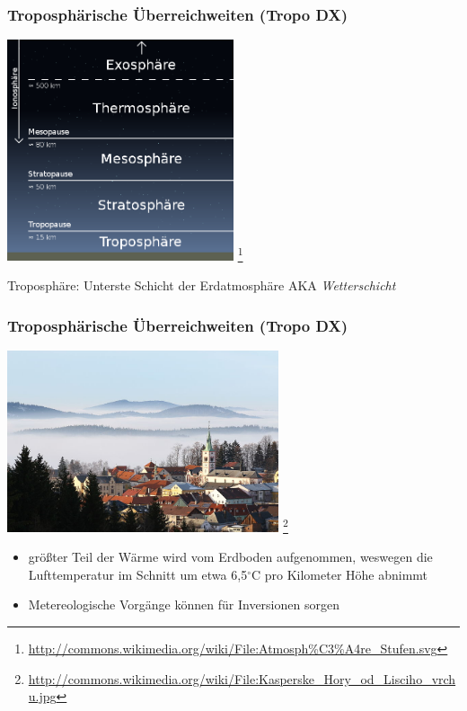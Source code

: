 \begin{frame}
    \frametitle{Troposphärische Überreichweiten (Tropo DX)}

    \begin{center}
        \includegraphics[width=0.5\textwidth,height=.6\textheight,keepaspectratio]{bv11/Atmosphaere_Stufen.png}
        \footnote{\tiny \url{http://commons.wikimedia.org/wiki/File:Atmosph\%C3\%A4re_Stufen.svg}}
    \end{center}

    Troposphäre: Unterste Schicht der Erdatmosphäre AKA \emph{Wetterschicht}

\end{frame}

\begin{frame}
    \frametitle{Troposphärische Überreichweiten (Tropo DX)}

    \begin{center}
        \includegraphics[width=0.6\textwidth,height=.6\textheight,keepaspectratio]{bv11/Inversionswetterlage.jpg}
        \footnote{\tiny \url{http://commons.wikimedia.org/wiki/File:Kasperske_Hory_od_Lisciho_vrchu.jpg}}
    \end{center}

    \begin{itemize}
        \item größter Teil der Wärme wird vom Erdboden aufgenommen, weswegen die
              Lufttemperatur im Schnitt um etwa 6,5$^\circ$C pro Kilometer Höhe abnimmt
        \item Metereologische Vorgänge können für Inversionen sorgen
    \end{itemize}

\end{frame}


